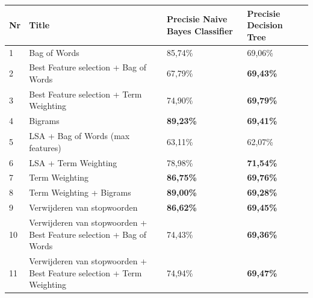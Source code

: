 \begin{table}[h]
\centering
\begin{adjustbox}{width=1\textwidth}
\begin{tabular}{|l|l|l|l|}
\hline
{\bf Nr} & {\bf Title}                                                                       & {\bf Precisie Naive Bayes Classifier} & {\bf Precisie Decision Tree} \\ \hline
1        & Bag of Words                                                                        & 85,74\%                                 & 69,06\%                        \\ \hline
2        & Best Feature selection + Bag of Words                               & 67,79\%                                 & {\bf 69,43\%}                  \\ \hline
3        & Best Feature selection + Term Weighting                                    & 74,90\%                                 & {\bf 69,79\%}                  \\ \hline
4        & Bigrams                                                                  & {\bf 89,23\%}                           & {\bf 69,41\%}                  \\ \hline
5        & LSA + Bag of Words (max features)                                                  & 63,11\%                                 & 62,07\%                        \\ \hline
6        & LSA + Term Weighting                                                        & 78,98\%                                 & {\bf 71,54\%}                  \\ \hline
7        & Term Weighting                                                                      & {\bf 86,75\%}                           & {\bf 69,76\%}                  \\ \hline
8        & Term Weighting + Bigrams                                                            & {\bf 89,00\%}                           & {\bf 69,28\%}                  \\ \hline
9        & Verwijderen van stopwoorden                                                         & {\bf 86,62\%}                           & {\bf 69,45\%}                  \\ \hline
10        & Verwijderen van stopwoorden + Best Feature selection + Bag of Words & 74,43\%                                 & {\bf 69,36\%}                  \\ \hline
11       & Verwijderen van stopwoorden + Best Feature selection + Term Weighting        & 74,94\%                                 & {\bf 69,47\%}                  \\ \hline

\end{tabular}
\end{adjustbox}
\end{table}
